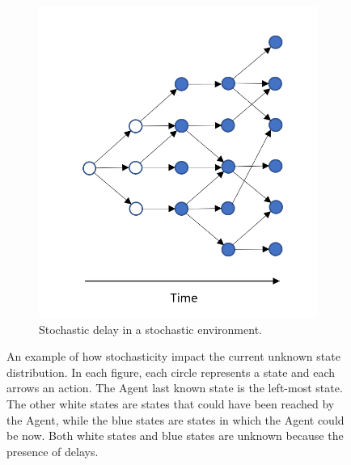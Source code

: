 \begin{figure}[t]
\begin{subfigure}[b]{.45\textwidth}
                        \includegraphics[width=\textwidth]{images/dmdp/modelbased_stochastic_4.png}
                        \caption{Stochastic delay in a stochastic environment.}
                        \label{fig:modelbased_stochastic_4}
                    \end{subfigure}
                    
                    \caption{An example of how stochasticity impact the current unknown state distribution. In each figure, each circle represents a state and each arrows an action. The Agent last known state is the left-most state. The other white states are states that could have been reached by the Agent, while the blue states are states in which the Agent could be now. Both white states and blue states are unknown because the presence of delays.}
                    \label{fig:modelbased_stochastic}
                \end{figure}
            
